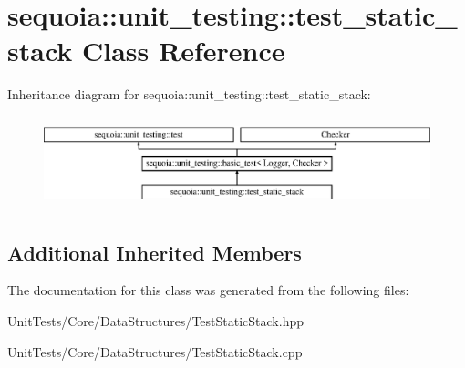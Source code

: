 \hypertarget{classsequoia_1_1unit__testing_1_1test__static__stack}{}\section{sequoia\+::unit\+\_\+testing\+::test\+\_\+static\+\_\+stack Class Reference}
\label{classsequoia_1_1unit__testing_1_1test__static__stack}
Inheritance diagram for sequoia\+::unit\+\_\+testing\+::test\+\_\+static\+\_\+stack\+:\begin{figure}[H]
\begin{center}
\leavevmode
\includegraphics[height=2.666667cm]{classsequoia_1_1unit__testing_1_1test__static__stack}
\end{center}
\end{figure}
\subsection*{Additional Inherited Members}


The documentation for this class was generated from the following files\+:\begin{DoxyCompactItemize}
\item 
Unit\+Tests/\+Core/\+Data\+Structures/Test\+Static\+Stack.\+hpp\item 
Unit\+Tests/\+Core/\+Data\+Structures/Test\+Static\+Stack.\+cpp\end{DoxyCompactItemize}

